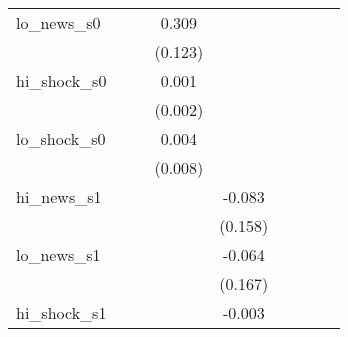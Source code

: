 {\begin{tabular}{l*{8}{c}}
\addlinespace
lo\_news\_s0  &                     &                     &       0.309\sym{**} &                     &                     &                     &                     &                     \\
            &                     &                     &     (0.123)         &                     &                     &                     &                     &                     \\
\addlinespace
hi\_shock\_s0 &                     &                     &       0.001         &                     &                     &                     &                     &                     \\
            &                     &                     &     (0.002)         &                     &                     &                     &                     &                     \\
\addlinespace
lo\_shock\_s0 &                     &                     &       0.004         &                     &                     &                     &                     &                     \\
            &                     &                     &     (0.008)         &                     &                     &                     &                     &                     \\
\addlinespace
hi\_news\_s1  &                     &                     &                     &      -0.083         &                     &                     &                     &                     \\
            &                     &                     &                     &     (0.158)         &                     &                     &                     &                     \\
\addlinespace
lo\_news\_s1  &                     &                     &                     &      -0.064         &                     &                     &                     &                     \\
            &                     &                     &                     &     (0.167)         &                     &                     &                     &                     \\
\addlinespace
hi\_shock\_s1 &                     &                     &                     &      -0.003         &                     &                     &                     &                     \\

\end{tabular}}
